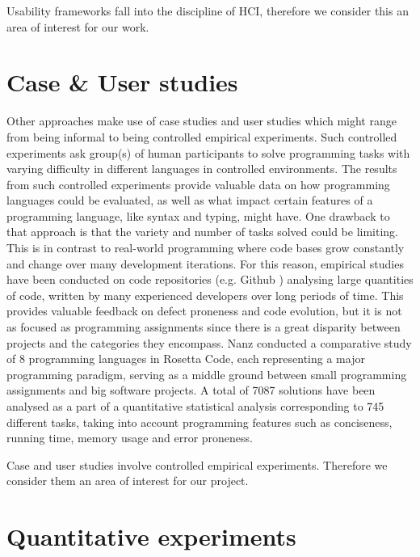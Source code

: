 Usability frameworks fall into the discipline of HCI, therefore we consider this an area of interest for our work.		

\section{Case \& User studies}
Other approaches make use of case studies and user studies which might range from being informal to being controlled empirical experiments. Such controlled experiments \cite{DynamicTypeSystems}\cite{MulticoreLangs}\cite{EmpiricalComparison} \cite{Empiricalinvestigation} ask group(s) of human participants to solve programming tasks with varying difficulty in different languages in controlled environments. The results from such controlled experiments provide valuable data on how programming languages could be evaluated, as well as what impact certain features of a programming language, like syntax and typing, might have. One drawback to that approach is that the variety and number of tasks solved could be limiting. This is in contrast to real-world programming where code bases grow constantly and change over many development iterations. For this reason, empirical studies have been conducted on code repositories (e.g. Github \cite{GitHub}) analysing large quantities of code, written by many experienced developers over long periods of time. This provides valuable feedback on defect proneness and code evolution, but it is not as focused as programming assignments since there is a great disparity between projects and the categories they encompass. Nanz \cite{RosettaCode} conducted a comparative study of 8 programming languages in Rosetta Code, each representing a major programming paradigm, serving as a middle ground between small programming assignments and big software projects. A total of 7087 solutions have been analysed as a part of a quantitative statistical analysis corresponding to 745 different tasks, taking into account programming features such as conciseness, running time, memory usage and error proneness.

Case and user studies involve controlled empirical experiments. Therefore we consider them an area of interest for our project.

\section{Quantitative experiments}

